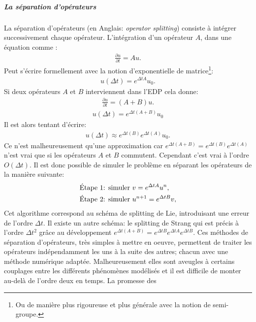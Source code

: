        \subparagraph{La séparation d'opérateurs}
            La séparation d'opérateurs (en Anglais: \textit{operator splitting}) consiste à intégrer successivement chaque opérateur.
            L'intégration d'un opérateur $A$, dans une équation comme :
            \begin{align}\frac{\partial u}{\partial t} = Au.\end{align}
            Peut s'écrire formellement avec la notion d'exponentielle de matrice\footnote{Ou de manière plus rigoureuse et plus générale avec la notion de semi-groupe.}:
            \begin{align}u(\Delta t) = e^{\Delta tA}u_0.\end{align}
            Si deux opérateurs $A$ et $B$ interviennent dans l'EDP cela donne:
            \begin{align}\frac{\partial u}{\partial t} = (A+B)u.\end{align}
            \begin{align}u(\Delta t) = e^{\Delta t (A+B)}u_0 \end{align}
            Il est alors tentant d'écrire:
            \begin{align}u(\Delta t)\approx e^{\Delta t(B)}e^{\Delta t(A)}u_0.\end{align}
            Ce n'est malheureusement qu'une approximation car $e^{\Delta t(A+B)} = e^{\Delta t(B)}e^{\Delta t(A)}$ n'est vrai que si les opérateurs $A$ et $B$ commutent.
            Cependant c'est vrai à l'ordre $O(\Delta t)$. 
            Il est donc possible de simuler le problème en séparant les opérateurs de la manière suivante: 
            \begin{align}
                \text{Étape 1: simuler }&v=e^{\Delta t A}u^n,\notag\\\notag
                \text{Étape 2: simuler }&u^{n+1}=e^{\Delta t B}v,\\
            \end{align}
            Cet algorithme correspond au schéma de splitting de Lie, introduisant une erreur de l'ordre $\Delta t$. 
            Il existe un autre schéma: le splitting de Strang qui est précis à l'ordre $\Delta t^2$ grâce au développement $e^{\Delta t (A+B)} = e^{\Delta t B}e^{\Delta t A} e^{\Delta t B}$.
            Ces méthodes de séparation d'opérateurs, très simples à mettre en oeuvre, permettent de traiter les opérateurs indépendamment les uns à la suite des autres; chacun avec une méthode numérique adaptée.
            Malheureusement elles sont aveugles à certains couplages entre les différents phénomènes modélisés et il est difficile de monter au-delà de l'ordre deux en temps. La promesse des
